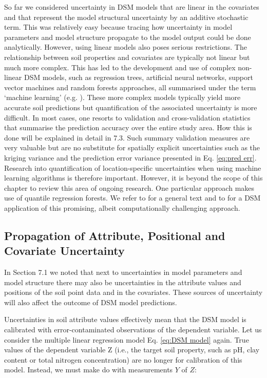 \documentclass[10pt,b5paper,]{book}
\theoremstyle{definition}
\theoremstyle{definition}
\theoremstyle{definition}
\theoremstyle{remark}
\begin{document}
So far we considered uncertainty in DSM models that are linear in the
covariates and that represent the model structural uncertainty by an
additive stochastic term. This was relatively easy because tracing how
uncertainty in model parameters and model structure propagate to the
model output could be done analytically. However, using linear models
also poses serious restrictions. The relationship between soil
properties and covariates are typically not linear but much more
complex. This has led to the development and use of complex non-linear
DSM models, such as regression trees, artificial neural networks,
support vector machines and random forests approaches, all summarised
under the term `machine learning' (e.g. \cite{hengl2015mapping}). These
more complex models typically yield more accurate soil predictions but
quantification of the associated uncertainty is more difficult. In most
cases, one resorts to validation and cross-validation statistics that
summarise the prediction accuracy over the entire study area. How this
is done will be explained in detail in 7.3. Such summary validation
measures are very valuable but are no substitute for spatially explicit
uncertainties such as the kriging variance and the prediction error
variance presented in Eq. \ref{eq:pred err}. Research into
quantification of location-specific uncertainties when using machine
learning algorithms is therefore important. However, it is beyond the
scope of this chapter to review this area of ongoing research. One
particular approach makes use of quantile regression forests. We refer
to \cite{meinshausen2006quantile} for a general text and to
\cite{vaysse2017using} for a DSM application of this promising, albeit
computationally challenging approach.

\hypertarget{propagation-of-attribute-positional-and-covariate-uncertainty}{%
\subsection{Propagation of Attribute, Positional and Covariate
Uncertainty}\label{propagation-of-attribute-positional-and-covariate-uncertainty}}

In Section 7.1 we noted that next to uncertainties in model parameters
and model structure there may also be uncertainties in the attribute
values and positions of the soil point data and in the covariates. These
sources of uncertainty will also affect the outcome of DSM model
predictions.

Uncertainties in soil attribute values effectively mean that the DSM
model is calibrated with error-contaminated observations of the
dependent variable. Let us consider the multiple linear regression model
Eq. \ref{eq:DSM model} again. True values of the dependent variable Z
(i.e., the target soil property, such as pH, clay content or total
nitrogen concentration) are no longer for calibration of this model.
Instead, we must make do with measurements \(Y\) of \(Z\):
\end{document}
